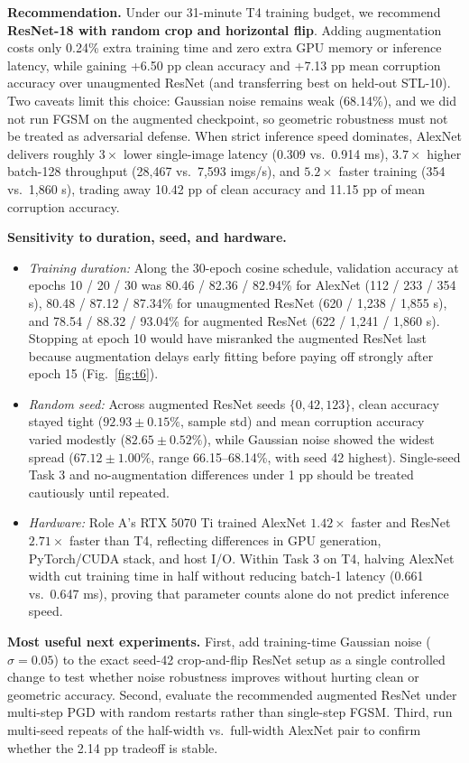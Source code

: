 \documentclass[10pt,a4paper]{article}
\begin{document}
\textbf{Recommendation.} Under our 31-minute T4 training budget, we recommend \textbf{ResNet-18 with random crop and horizontal flip}. Adding augmentation costs only 0.24\% extra training time and zero extra GPU memory or inference latency, while gaining +6.50 pp clean accuracy and +7.13 pp mean corruption accuracy over unaugmented ResNet (and transferring best on held-out STL-10). Two caveats limit this choice: Gaussian noise remains weak (68.14\%), and we did not run FGSM on the augmented checkpoint, so geometric robustness must not be treated as adversarial defense. When strict inference speed dominates, AlexNet delivers roughly $3\times$ lower single-image latency (0.309 vs.\ 0.914 ms), $3.7\times$ higher batch-128 throughput (28,467 vs.\ 7,593 imgs/s), and $5.2\times$ faster training (354 vs.\ 1,860 s), trading away 10.42 pp of clean accuracy and 11.15 pp of mean corruption accuracy.

\textbf{Sensitivity to duration, seed, and hardware.}
\begin{itemize}
\item \textit{Training duration:} Along the 30-epoch cosine schedule, validation accuracy at epochs 10 / 20 / 30 was 80.46 / 82.36 / 82.94\% for AlexNet (112 / 233 / 354 s), 80.48 / 87.12 / 87.34\% for unaugmented ResNet (620 / 1,238 / 1,855 s), and 78.54 / 88.32 / 93.04\% for augmented ResNet (622 / 1,241 / 1,860 s). Stopping at epoch 10 would have misranked the augmented ResNet last because augmentation delays early fitting before paying off strongly after epoch 15 (Fig.~\ref{fig:t6}).
\item \textit{Random seed:} Across augmented ResNet seeds $\{0, 42, 123\}$, clean accuracy stayed tight ($92.93 \pm 0.15\%$, sample std) and mean corruption accuracy varied modestly ($82.65 \pm 0.52\%$), while Gaussian noise showed the widest spread ($67.12 \pm 1.00\%$, range 66.15--68.14\%, with seed 42 highest). Single-seed Task 3 and no-augmentation differences under 1 pp should be treated cautiously until repeated.
\item \textit{Hardware:} Role A's RTX 5070 Ti trained AlexNet $1.42\times$ faster and ResNet $2.71\times$ faster than T4, reflecting differences in GPU generation, PyTorch/CUDA stack, and host I/O. Within Task 3 on T4, halving AlexNet width cut training time in half without reducing batch-1 latency (0.661 vs.\ 0.647 ms), proving that parameter counts alone do not predict inference speed.
\end{itemize}

\textbf{Most useful next experiments.} First, add training-time Gaussian noise ($\sigma = 0.05$) to the exact seed-42 crop-and-flip ResNet setup as a single controlled change to test whether noise robustness improves without hurting clean or geometric accuracy. Second, evaluate the recommended augmented ResNet under multi-step PGD with random restarts rather than single-step FGSM. Third, run multi-seed repeats of the half-width vs.\ full-width AlexNet pair to confirm whether the 2.14 pp tradeoff is stable.
\end{document}
